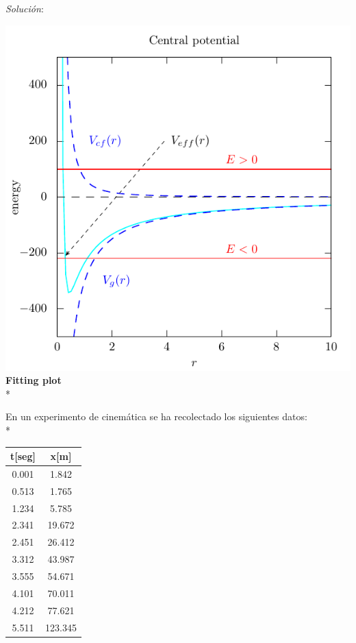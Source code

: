 \documentclass[11.5pt,a4paper]{article}
\begin{document}
\textit{Solución}:

\includegraphics[scale=0.75]{ejercicio2.pdf}\\

\textbf{Fitting plot}\\*

En un experimento de cinemática se ha recolectado los siguientes datos:\\*

\begin{center}
\begin{tabular}{|c|c|}
\hline 
{\bf t[seg]} & {\bf x[m]} \\ 
\hline
0.001 & 1.842 \\ 
\hline 
0.513 & 1.765 \\ 
\hline 
1.234 & 5.785 \\ 
\hline 
2.341 & 19.672 \\ 
\hline 
2.451 & 26.412 \\ 
\hline 
3.312 & 43.987\\
\hline
3.555 & 54.671\\
\hline
4.101 & 70.011\\
\hline
4.212 & 77.621\\
\hline
5.511 & 123.345\\
\hline
\end{tabular} 
\end{center}
\end{document}
